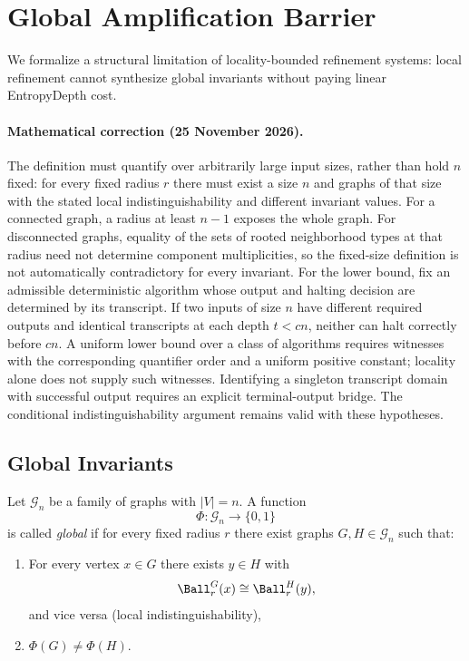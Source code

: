 \section{Global Amplification Barrier}
\label{sec:global_amplification_barrier}

We formalize a structural limitation of locality-bounded refinement systems:
local refinement cannot synthesize global invariants without paying linear
EntropyDepth cost.

\paragraph{Mathematical correction (25 November 2026).} The definition must quantify over arbitrarily large input sizes, rather than hold $n$ fixed: for every fixed radius $r$ there must exist a size $n$ and graphs of that size with the stated local indistinguishability and different invariant values. For a connected graph, a radius at least $n-1$ exposes the whole graph. For disconnected graphs, equality of the sets of rooted neighborhood types at that radius need not determine component multiplicities, so the fixed-size definition is not automatically contradictory for every invariant. For the lower bound, fix an admissible deterministic algorithm whose output and halting decision are determined by its transcript. If two inputs of size $n$ have different required outputs and identical transcripts at each depth $t<cn$, neither can halt correctly before $cn$. A uniform lower bound over a class of algorithms requires witnesses with the corresponding quantifier order and a uniform positive constant; locality alone does not supply such witnesses. Identifying a singleton transcript domain with successful output requires an explicit terminal-output bridge. The conditional indistinguishability argument remains valid with these hypotheses.

\subsection{Global Invariants}

\begin{definition}
Let $\mathcal{G}_n$ be a family of graphs with $|V|=n$.
A function
\[
\Phi : \mathcal{G}_n \to \{0,1\}
\]
is called \emph{global} if for every fixed radius $r$
there exist graphs $G,H \in \mathcal{G}_n$ such that:

\begin{enumerate}
\item For every vertex $x\in G$ there exists $y\in H$ with
\[
\Ball_r^G(x) \cong \Ball_r^H(y),
\]
and vice versa (local indistinguishability),

\item $\Phi(G) \ne \Phi(H)$.
\end{enumerate}
\end{definition}

